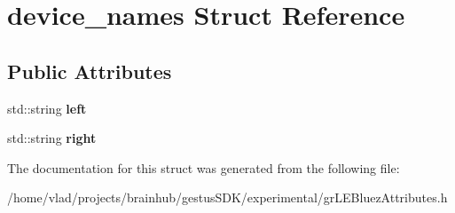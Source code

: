 \hypertarget{structdevice__names}{}\section{device\+\_\+names Struct Reference}
\label{structdevice__names}
\subsection*{Public Attributes}
\begin{DoxyCompactItemize}
\item 
\mbox{\label{structdevice__names_a2bb27860a20d44acaa75c72aa24081e0}} 
std\+::string {\bfseries left}
\item 
\mbox{\label{structdevice__names_a54a02fec078cf2f0b4456c0febaf0694}} 
std\+::string {\bfseries right}
\end{DoxyCompactItemize}


The documentation for this struct was generated from the following file\+:\begin{DoxyCompactItemize}
\item 
/home/vlad/projects/brainhub/gestus\+S\+D\+K/experimental/gr\+L\+E\+Bluez\+Attributes.\+h\end{DoxyCompactItemize}
